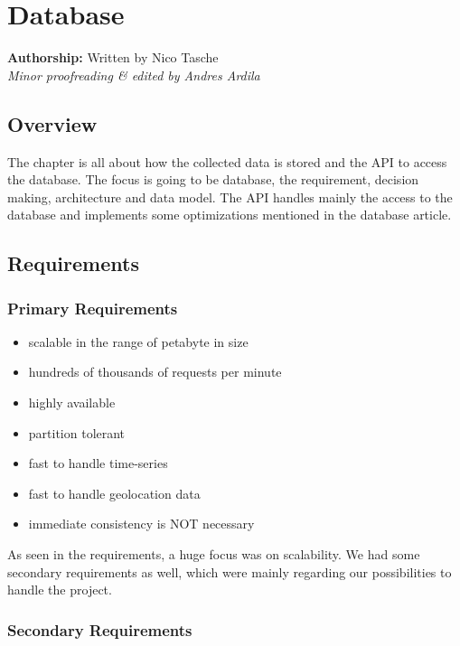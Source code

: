 \section{Database}\label{sec:database}

\textbf{Authorship: } Written by Nico Tasche\\
\emph{Minor proofreading \& edited by Andres Ardila} \\

\vspace*{4mm}

\subsection{Overview}\label{overview}

The chapter is all about how the collected data is stored and the API to
access the database. The focus is going to be database, the requirement,
decision making, architecture and data model. The API handles mainly the
access to the database and implements some optimizations mentioned in
the database article.

\subsection{Requirements}\label{requirements}

\subsubsection{Primary Requirements}\label{primary-requirements}

\begin{itemize}
\tightlist
\item
  scalable in the range of petabyte in size
\item
  hundreds of thousands of requests per minute
\item
  highly available
\item
  partition tolerant
\item
  fast to handle time-series
\item
  fast to handle geolocation data
\item
  immediate consistency is NOT necessary
\end{itemize}

As seen in the requirements, a huge focus was on scalability. We had
some secondary requirements as well, which were mainly regarding our
possibilities to handle the project.

\subsubsection{Secondary Requirements}\label{secondary-requirements}

